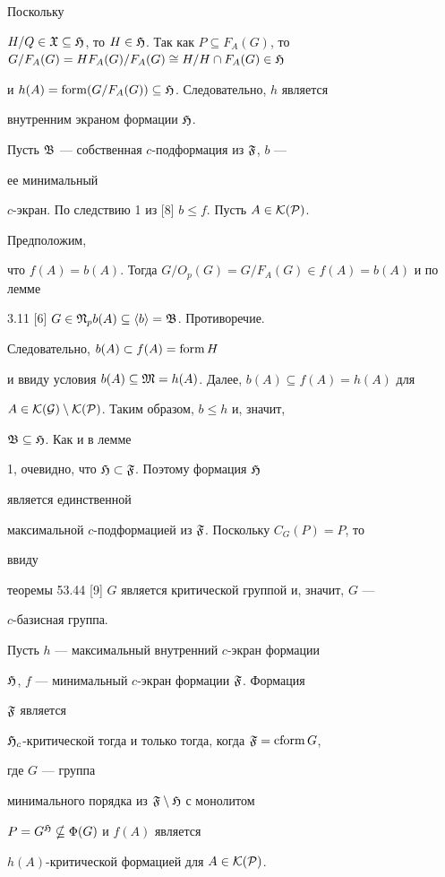 \begin{pf}
Поскольку 


$H/Q\in\frak X\subseteq\frak H$, то $H\in\frak H$. Так как $P\subseteq 


F_A(G)$, то $G/F_A(G)=H F_A(G)/F_A(G)\cong H/H\cap F_A(G)\in\frak H$ 


и $h(A)=\operatorname{form}(G/F_A(G))\subseteq\frak H$. Следовательно, $h$ является 


внутренним экраном формации $\frak H$. 


 


Пусть $\frak B$ --- собственная $c$-подформация из $\frak F$, $b$ --- 


ее минимальный 


$c$-экран. По следствию 1 из [8] $b\le f$. Пусть $A\in\cal K(P)$. 


Предположим, 


что $f(A)=b(A)$. Тогда $G/O_p(G)=G/F_A(G)\in f(A)=b(A)$ и по лемме 


3.11 [6] $G\in\frak N_p b(A)\subseteq\langle b\rangle=\frak B$. Противоречие. 


Следовательно, $b(A)\subset f(A)=\operatorname{form} H$ 


и ввиду условия $b(A)\subseteq\frak M=h(A)$. Далее, $b(A)\subseteq 


f(A)=h(A)$ для 


$A\in\cal K(G)\setminus\cal K(P)$. Таким образом, $b\le h$ и, значит, 


$\frak B\subseteq\frak H$. Как и в лемме 


1, очевидно, что $\frak H\subset\frak F$. Поэтому формация $\frak H$ 


является единственной 


максимальной $c$-подформацией из $\frak F$. Поскольку $C_G(P)=P$, то 


ввиду 


теоремы 53.44 [9] $G$ является критической группой и, значит, $G$ --- 


$c$-базисная группа. 


\end{pf} 


 


\begin{lem} 


Пусть $h$ --- максимальный внутренний $c$-экран формации 


$\frak H$, $f$ --- минимальный $c$-экран формации $\frak F$. Формация 


$\frak F$ является 


$\frak H_c$-критической тогда и только тогда, когда $\frak F=\operatorname{cform} G$, 


где $G$ --- группа 


минимального порядка из $\frak F\setminus\frak H$ с монолитом 


$P=G^{\frak H}\nsubseteq\Phi(G)$ и $f(A)$ является 


$h(A)$-критической формацией для $A\in\cal K(P)$. 


\end{lem} 


